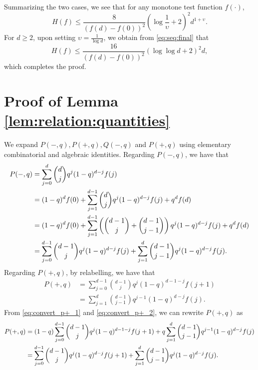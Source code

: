 \documentclass[onecolumn,letterpaper]{IEEEtran}
\newcommand{\cp}{{q}}
\newcommand{\pn}{{P(-,\cp)}}
\newcommand{\pp}{{P(+,\cp)}}
\newcommand{\pnm}{{Q(-,\cp)}}
\newcommand{\fH}{{H(f)}}
\newcommand{\ups}{{\upsilon}}
\begin{document}
Summarizing the two cases, we see that for any monotone test function $f(\cdot)$, 
\begin{equation} 
\label{eq:seq:final}
  \fH\leq \frac {8}{\left(f(d)-f(0)\right)^2}\left(\log \frac 1 \ups +2\right)^2 d^{1+\ups}.
\end{equation}
For $d\geq 2$, upon setting $\ups = \frac{1}{\log d}$, we obtain from \eqref{eq:seq:final} that 
\begin{equation}
    \fH \le \frac{16}{\left(f(d)-f(0)\right)^2} \left(\log\log d+2\right)^2 d,
\end{equation}
which completes the proof.%

\section{Proof of Lemma \ref{lem:relation:quantities}}
\label{app:convert_delta_nabla}
We expand $\pn, \pp,\pnm$ and $\pp$ using elementary combinatorial and algebraic identities. 
Regarding $\pn$, we have that 
\begin{align}
\label{eq:convert_p-}
\pn &= \sum\limits_{j=0}^{d} \binom{d}{j} \cp^j (1-\cp)^{d-j} f(j) \notag\\ 
  &= (1-\cp)^d f(0)+ \sum\limits_{j=1}^{d-1} \binom{d}{j} \cp^j (1-\cp)^{d-j} f(j) +\cp^d f(d) \notag\\ 
 &=(1-\cp)^d f(0)+ \sum\limits_{j=1}^{d-1} \left( \binom{d-1}{j} + \binom{d-1}{j-1} \right) \cp^j (1-\cp)^{d-j} f(j)  +\cp^d f(d) \notag\\ 
&= \sum\limits_{j=0}^{d-1} \binom{d-1}{j} \cp^j (1-\cp)^{d-j} f(j) + \sum\limits_{j=1}^{d} \binom{d-1}{j-1} \cp^j (1-\cp)^{d-j} f(j).
\end{align}
Regarding $\pp$, by relabelling, we have that
\begin{align}
\pp &= \sum\limits_{j=0}^{d-1} \binom{d-1}{j} \cp^j (1-\cp)^{d-1-j} f(j+1) \label{eq:convert_p+_1} \\ 
&= \sum\limits_{j=1}^{d} \binom{d-1}{j-1} \cp^{j-1} (1-\cp)^{d-j} f(j). \label{eq:convert_p+_2}
\end{align}
From \eqref{eq:convert_p+_1} and \eqref{eq:convert_p+_2}, we can rewrite $\pp$ as 
\begin{align} 
\label{eq:convert_p+}
\pp &= (1-\cp) \sum\limits_{j=0}^{d-1} \binom{d-1}{j} \cp^j (1-\cp)^{d-1-j} f(j+1) + \cp \sum\limits_{j=1}^{d} \binom{d-1}{j-1} \cp^{j-1} (1-\cp)^{d-j} f(j) \notag\\
&= \sum\limits_{j=0}^{d-1} \binom{d-1}{j} \cp^j (1-\cp)^{d-j} f(j+1) + \sum\limits_{j=1}^{d} \binom{d-1}{j-1} \cp^j (1-\cp)^{d-j} f(j).
\end{align}
\end{document}
